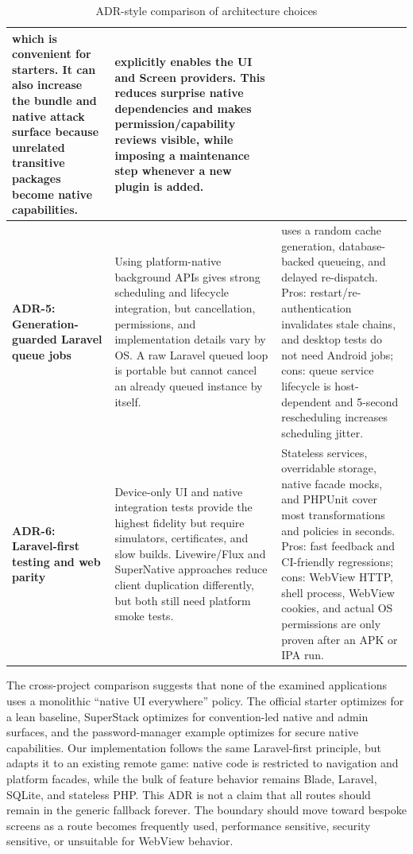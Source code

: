 \begin{table}[!ht]
\begin{tabularx}{\textwidth}{|p{}|X|X|}
    which is convenient for starters. It can also increase the bundle and native attack surface
    because unrelated transitive packages become native capabilities. &
    \q{NativeServiceProvider::plugins()} explicitly enables the UI and Screen providers. This
    reduces surprise native dependencies and makes permission/capability reviews visible, while
    imposing a maintenance step whenever a new plugin is added. \\
    \hline
    \textbf{ADR-5: Generation-guarded Laravel queue jobs} &
    Using platform-native background APIs gives strong scheduling and lifecycle integration, but
    cancellation, permissions, and implementation details vary by OS. A raw Laravel queued loop
    is portable but cannot cancel an already queued instance by itself. &
    \q{ListenStream} uses a random cache generation, database-backed queueing, and delayed
    re-dispatch. Pros: restart/re-authentication invalidates stale chains, and desktop tests do not
    need Android jobs; cons: queue service lifecycle is host-dependent and 5-second rescheduling
    increases scheduling jitter. \\
    \hline
    \textbf{ADR-6: Laravel-first testing and web parity} &
    Device-only UI and native integration tests provide the highest fidelity but require simulators,
    certificates, and slow builds. Livewire/Flux and SuperNative approaches reduce client
    duplication differently, but both still need platform smoke tests. &
    Stateless services, overridable storage, native facade mocks, and PHPUnit cover most
    transformations and policies in seconds. Pros: fast feedback and CI-friendly regressions;
    cons: WebView HTTP, shell process, WebView cookies, and actual OS permissions are only proven
    after an APK or IPA run. \\
    \hline
  \end{tabularx}
  \caption{ADR-style comparison of architecture choices}
  \label{tbl:architecture-adrs}
\end{table}

The cross-project comparison suggests that none of the examined applications uses a monolithic
``native UI everywhere'' policy. The official starter optimizes for a lean baseline, SuperStack
optimizes for convention-led native and admin surfaces, and the password-manager example optimizes
for secure native capabilities. Our implementation follows the same Laravel-first principle, but
adapts it to an existing remote game: native code is restricted to navigation and platform
facades, while the bulk of feature behavior remains Blade, Laravel, SQLite, and stateless PHP.
This ADR is not a claim that all routes should remain in the generic fallback forever. The
boundary should move toward bespoke screens as a route becomes frequently used, performance
sensitive, security sensitive, or unsuitable for WebView behavior.

